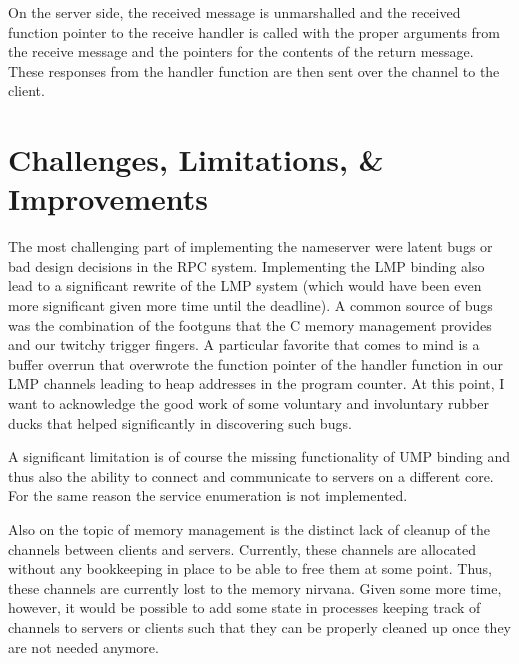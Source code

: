 On the server side, the received message is unmarshalled and the received function pointer to the receive handler
is called with the proper arguments from the receive message and the pointers for the contents of the return message.
These responses from the handler function are then sent over the channel to the client.

\section{Challenges, Limitations, \& Improvements}
The most challenging part of implementing the nameserver were latent bugs or bad design decisions in the RPC system.
Implementing the LMP binding also lead to a significant rewrite of the LMP system (which would have been even
more significant given more time until the deadline). A common source of bugs was the combination of the
footguns that the C memory management provides and our twitchy trigger fingers. A particular favorite that comes to
mind is a buffer overrun that overwrote the function pointer of the handler function in our LMP channels
leading to heap addresses in the program counter. At this point, I want to acknowledge the good work of some
voluntary and involuntary rubber ducks that helped significantly in discovering such bugs.

A significant limitation is of course the missing functionality of UMP binding and thus also the ability
to connect and communicate to servers on a different core. For the same reason the service enumeration is not implemented.

Also on the topic of memory management is the distinct lack of cleanup of the channels between clients and
servers. Currently, these channels are allocated without any bookkeeping in place to be able to free them at
some point. Thus, these channels are currently lost to the memory nirvana. Given some more time, however, it
would be possible to add some state in processes keeping track of channels to servers or clients such that 
they can be properly cleaned up once they are not needed anymore.

